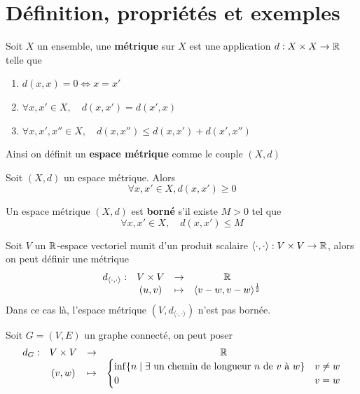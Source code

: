 \section{Définition, propriétés et exemples}
\begin{definition} \label{def: Espace métrique}
	Soit $X$ un ensemble, une \textbf{métrique} sur $X$ est une application $d : X \times X \to \mathbb{R}$ telle que
	\begin{enumerate}
		\item $d(x,x) = 0 \iff x = x'$
		\item $\forall x,x' \in X, \quad d(x,x') = d(x', x)$
		\item $\forall x,x',x'' \in X, \quad d(x,x'') \leqslant d(x,x') + d(x',x'')$
	\end{enumerate}
	Ainsi on définit un \textbf{espace métrique} comme le couple $(X,d)$
\end{definition}

\begin{lemme}[Positivité] \label{Positivité}
	Soit $(X,d)$ un espace métrique. Alors 
	\[
	\forall x,x' \in X, d(x,x') \geqslant 0
	\]
\end{lemme}
\begin{definition} \label{def: Espace métrique borné}
	Un espace métrique $(X,d)$ est \textbf{borné} s'il existe $M > 0$ tel que
	\[
	\forall x, x' \in X, \quad d(x,x') \leqslant M
	\]
\end{definition}

\begin{exemple} \label{ex: Espace métrique sur un espace vectoriel}
	Soit $V$ un $\mathbb{R}$-espace vectoriel munit d'un produit scalaire $\langle \cdot, \cdot \rangle : V \times V \to \mathbb{R}$, alors on peut définir une métrique
	\[
	\begin{array}{cccc}
		d_{\langle \cdot, \cdot \rangle} : & V \times V & \to & \mathbb{R} \\
											& (u,v) & \mapsto & \langle v-w, v-w \rangle^\frac12
	\end{array}
	\]
	Dans ce cas là, l'espace métrique $(V, d_{\langle \cdot, \cdot \rangle})$ n'est pas bornée.
\end{exemple}

\begin{exemple} \label{Espace métrique sur un graphe}
	Soit $G= (V,E)$ un graphe connecté, on peut poser
	\[
	\begin{array}{cccc}
		d_G : & V \times V & \to & \mathbb{R} \\
				& (v,w) & \mapsto& \begin{cases}
					\inf \{ n \mid \exists \text{ un chemin de longueur } n \text{ de $v$ à $w$} \} & v \neq w\\
					0 & v = w
				\end{cases}
	\end{array}
	\]
\end{exemple}


